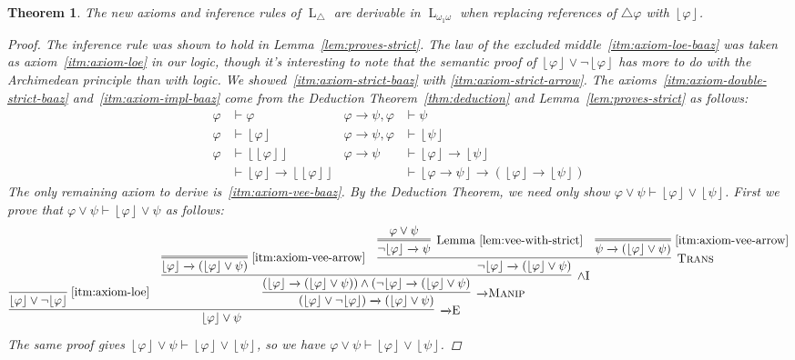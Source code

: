 \documentclass{amsart}
\newtheorem{theorem}{Theorem}[section]
\theoremstyle{definition}
\numberwithin{equation}{theorem}
\renewcommand{\phi}{\varphi}
\newcommand{\unwedge}{{\wedge}}
\newcommand{\proves}{\vdash}
\newcommand{\strict}[1]{{\left\lfloor#1\right\rfloor}}
\newcommand{\narrow}[1]{\xrightarrow{#1}}
\renewcommand{\to}{\narrow{}}
\newcommand{\arr}{{\to}}
\newcommand{\intro}{\!\operatorname{I}}
\newcommand{\elim}{\!\operatorname{E}}
\newcommand{\trans}{\text{\sc{Trans}}}
\newcommand{\aref}[1]{\!\text{\ref{itm:axiom-#1}}}
\newcommand{\pushdown}{\arr\text{\sc{Manip}}}
\newcommand{\baselang}{\operatorname{L}}
\newcommand{\lang}{\baselang_{\omega_1\omega}}
\begin{document}
\begin{theorem}\label{thm:delta-strict}
  The new axioms and inference rules of $\baselang_\triangle$ are derivable in $\lang$ when replacing references of $\triangle\phi$ with $\strict\phi$.
  \begin{proof}
    The inference rule was shown to hold in Lemma~\ref{lem:proves-strict}.
    The law of the excluded middle~\ref{itm:axiom-loe-baaz} was taken as axiom~\ref{itm:axiom-loe} in our logic, though it's interesting to note that the semantic proof of $\strict{\phi}\vee\neg\strict\phi$ has more to do with the Archimedean principle than with logic.
    We showed~\ref{itm:axiom-strict-baaz} with \ref{itm:axiom-strict-arrow}.
    The axioms~\ref{itm:axiom-double-strict-baaz} and~\ref{itm:axiom-impl-baaz} come from the Deduction Theorem~\ref{thm:deduction} and Lemma~\ref{lem:proves-strict} as follows:
    \begin{align*}
      \phi&\proves\phi&  \phi\to\psi,\phi&\proves\psi\\
      \phi&\proves\strict\phi&  \phi\to\psi,\phi&\proves\strict\psi\\
      \phi&\proves\strict{\strict\phi}&  \phi\to\psi&\proves\strict\phi\to\strict\psi\\
      &\proves\strict{\phi}\to\strict{\strict\phi}&
      &\proves\strict{\phi\to\psi}\to(\strict\phi\to\strict\psi)
    \end{align*}
    The only remaining axiom to derive is~\ref{itm:axiom-vee-baaz}.
    By the Deduction Theorem, we need only show $\phi\vee\psi\proves\strict\phi\vee\strict\psi$.
    First we prove that $\phi\vee\psi\proves\strict\phi\vee\psi$ as follows:
    \[
      \infer[\arr\elim]{\strict\phi\vee\psi}{
        \infer[\aref{loe}]{\strict\phi\vee\neg\strict\phi}{} &
        \infer[\pushdown]{(\strict\phi\vee\neg\strict\phi)\to(\strict\phi\vee\psi)}{
          \infer[\unwedge\intro]{(\strict\phi\to(\strict\phi\vee\psi))\wedge(\neg\strict\phi\to(\strict\phi\vee\psi)}{
            \infer=[\aref{vee-arrow}]{\strict\phi\to(\strict\phi\vee\psi)}{} &
            \infer[\trans]{\neg\strict\phi\to(\strict\phi\vee\psi)}{
              \infer=[\text{Lemma~\ref{lem:vee-with-strict}}]{\neg\strict\phi\to\psi}{\phi\vee\psi} &
              \infer=[\aref{vee-arrow}]{\psi\to(\strict\phi\vee\psi)}{}
            }
          }
        }
      }
    \]
    The same proof gives $\strict\phi\vee\psi\proves\strict\phi\vee\strict\psi$, so we have $\phi\vee\psi\proves\strict\phi\vee\strict\psi$.
  \end{proof}
\end{theorem}
\end{document}
